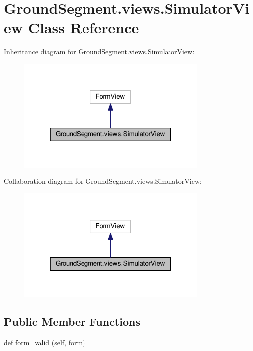\hypertarget{class_ground_segment_1_1views_1_1_simulator_view}{}\section{Ground\+Segment.\+views.\+Simulator\+View Class Reference}
\label{class_ground_segment_1_1views_1_1_simulator_view}


Inheritance diagram for Ground\+Segment.\+views.\+Simulator\+View\+:\nopagebreak
\begin{figure}[H]
\begin{center}
\leavevmode
\includegraphics[width=262pt]{class_ground_segment_1_1views_1_1_simulator_view__inherit__graph}
\end{center}
\end{figure}


Collaboration diagram for Ground\+Segment.\+views.\+Simulator\+View\+:\nopagebreak
\begin{figure}[H]
\begin{center}
\leavevmode
\includegraphics[width=262pt]{class_ground_segment_1_1views_1_1_simulator_view__coll__graph}
\end{center}
\end{figure}
\subsection*{Public Member Functions}
\begin{DoxyCompactItemize}
\item 
def \hyperlink{class_ground_segment_1_1views_1_1_simulator_view_a436910471c434793534ba9e693b04058}{form\+\_\+valid} (self, form)
\end{DoxyCompactItemize}

